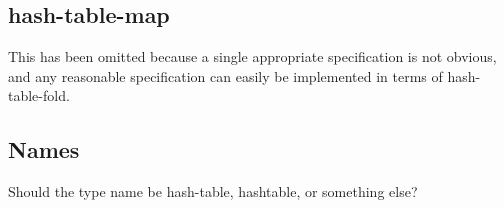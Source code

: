 \documentclass[twoside]{algol60}
\begin{document}
\subsection{hash-table-map}
This has been omitted because a single appropriate specification is not obvious, and any reasonable specification can easily be implemented in terms of {\cf hash-table-fold}.

\subsection{Names}
Should the type name be {\cf hash-table}, {\cf hashtable}, or something else?


\end{document}
